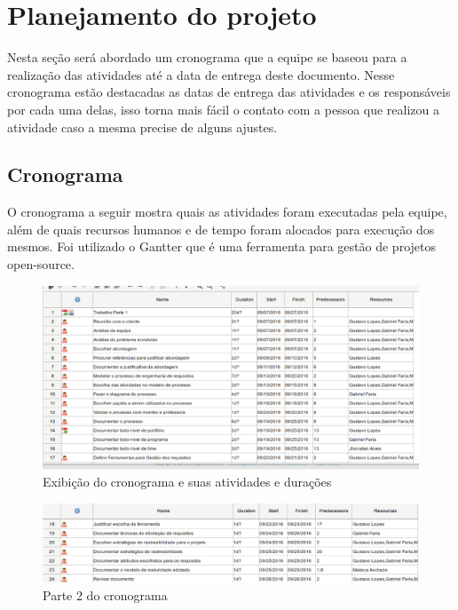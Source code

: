 \chapter{Planejamento do projeto}

Nesta seção será abordado um cronograma que a equipe se baseou para a realização das atividades até a data de entrega deste documento. Nesse cronograma estão destacadas as datas de entrega das atividades e os responsáveis por cada uma delas, isso torna mais fácil o contato com a pessoa que realizou a atividade caso a mesma precise de alguns ajustes.

\section{Cronograma}

	O cronograma a seguir mostra quais as atividades foram executadas pela equipe, além de quais recursos humanos e de tempo foram alocados para execução dos mesmos. Foi utilizado o Gantter que é uma ferramenta para gestão de projetos open-source.

	\begin{figure}[!htpb]
	\centering
	\includegraphics[scale=0.4]{figuras/cronograma/parte1}
	\caption{Exibição do cronograma e suas atividades e durações}
	\end{figure}

	\begin{figure}[!htpb]
	\centering
	\includegraphics[scale=0.4]{figuras/cronograma/parte2}
	\caption{Parte 2 do cronograma}
	\end{figure}


